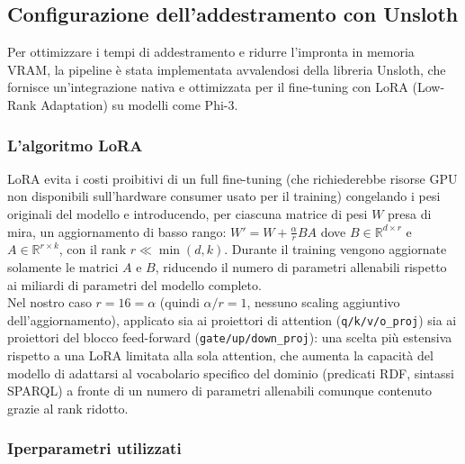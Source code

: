 \documentclass[12pt,a4paper,oneside]{book}
\newcommand{\code}[1]{\colorbox{light-gray}{\texttt{#1}}}
\begin{document}
\newpage

\subsection{Configurazione dell'addestramento con Unsloth}\label{subsec:unsloth}
    Per ottimizzare i tempi di addestramento e ridurre l'impronta in memoria VRAM, la pipeline è stata implementata avvalendosi della libreria Unsloth, che fornisce un'integrazione nativa e ottimizzata per il fine-tuning con LoRA (Low-Rank Adaptation) su modelli come Phi-3.

    \subsubsection{L'algoritmo LoRA}
        LoRA evita i costi proibitivi di un full fine-tuning (che richiederebbe risorse GPU non disponibili sull'hardware consumer usato per il training) congelando i pesi originali del modello e introducendo, per ciascuna matrice di pesi $W$ presa di mira, un aggiornamento di basso rango: $W' = W + \frac{\alpha}{r}BA$ dove $B \in \mathbb{R}^{d \times r}$ e $A \in \mathbb{R}^{r \times k}$, con il rank $r \ll \min(d,k)$. Durante il training vengono aggiornate solamente le matrici $A$ e $B$, riducendo il numero di parametri allenabili rispetto ai miliardi di parametri del modello completo.\\
        Nel nostro caso $r = 16 = \alpha$ (quindi $\alpha/r = 1$, nessuno scaling aggiuntivo dell'aggiornamento), applicato sia ai proiettori di attention (\code{q/k/v/o\_proj}) sia ai proiettori del blocco feed-forward (\code{gate/up/down\_proj}): una scelta più estensiva rispetto a una LoRA limitata alla sola attention, che aumenta la capacità del modello di adattarsi al vocabolario specifico del dominio (predicati RDF, sintassi SPARQL) a fronte di un numero di parametri allenabili comunque contenuto grazie al rank ridotto.

\subsubsection{Iperparametri utilizzati}\label{subsec:hyperparams}
\end{document}
